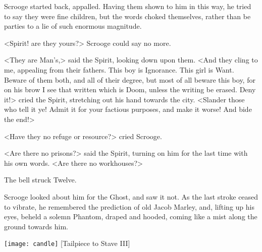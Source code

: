 Scrooge started back, appalled. Having them shown to him in this way, he tried to say they were fine children, but the words choked themselves, rather than be parties to a lie of such enormous magnitude.

<Spirit! are they yours?> Scrooge could say no more.

<They are Man's,> said the Spirit, looking down upon them. <And they cling to me, appealing from their fathers. This boy is Ignorance. This girl is Want. Beware of them both, and all of their degree, but most of all beware this boy, for on his brow I see that written which is Doom, unless the writing be erased. Deny it!> cried the Spirit, stretching out his hand towards the city. <Slander those who tell it ye! Admit it for your factious purposes, and make it worse! And bide the end!>

<Have they no refuge or resource?> cried Scrooge.

<Are there no prisons?> said the Spirit, turning on him for the last time with his own words. <Are there no workhouses?>

The bell struck Twelve.

Scrooge looked about him for the Ghost, and saw it not. As the last stroke ceased to vibrate, he remembered the prediction of old Jacob Marley, and, lifting up his eyes, beheld a solemn Phantom, draped and hooded, coming like a mist along the ground towards him.

\vfill

	\begin{center}
		\texttt{[image: candle]}
		[Tailpiece to Stave III]{}
	\end{center}

